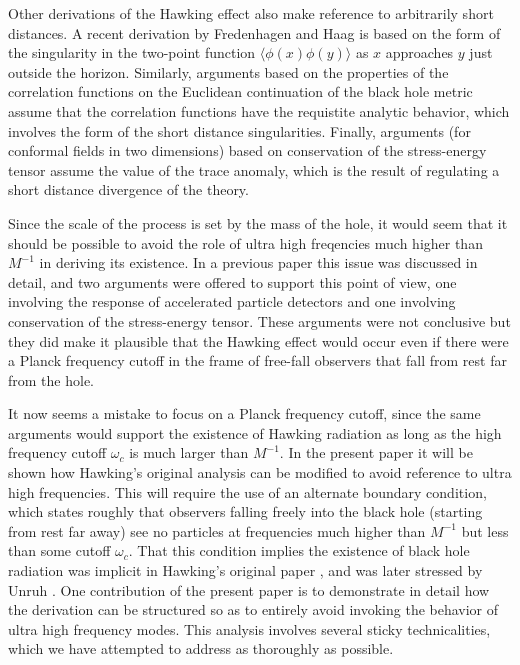 Other derivations of the Hawking effect also make reference
to arbitrarily short distances. A recent derivation by
Fredenhagen and Haag \cite{FredHaag} is based on the form of the
singularity in the two-point function
$\langle\phi(x)\phi(y)\rangle$ as $x$ approaches $y$
just outside the horizon.
Similarly, arguments based on the properties of the
correlation functions on the Euclidean continuation of the
black hole metric \cite{GibbPerry} assume that the correlation
functions have the requistite analytic behavior, which
involves the form of the short distance singularities.
Finally, arguments (for conformal fields  in two dimensions)
based on conservation of the stress-energy tensor
\cite{DavFullUn,ChristFull} assume the value of the trace
anomaly, which is the result of regulating a short distance
divergence of the theory.

Since the scale of the process is set by the mass of the
hole, it would seem that it should be possible to avoid the
role of ultra high freqencies much higher than $M^{-1}$
in deriving its existence. In a previous paper \cite{Jac} this
issue was discussed in detail, and two arguments were
offered to support this point of view, one involving the
response of accelerated particle detectors and one involving
conservation of the stress-energy tensor. These arguments
were not conclusive but they did make it plausible that the
Hawking effect would occur even if there were a Planck
frequency cutoff in the frame of free-fall observers that
fall from rest far from the hole.

It now seems a mistake to focus on a Planck frequency
cutoff, since the same arguments would support the existence
of Hawking radiation as long as the high frequency  cutoff
$\omega_c$ is much larger than $M^{-1}$.
In the present paper it will be shown how Hawking's original
analysis can be modified to avoid reference to ultra high
frequencies. This will require the use of an alternate
boundary condition, which states roughly that observers
falling freely into the black hole (starting from rest
far away) see no particles at frequencies much higher than
$M^{-1}$ but less than some cutoff $\omega_c$.
That this condition implies the existence of
black hole radiation was implicit in Hawking's original
paper \cite{Hawk75}, and was later stressed by Unruh \cite{Origin}.
One contribution of the present paper is to demonstrate
in detail how the derivation can be structured so as to
entirely avoid invoking the behavior of ultra high
frequency modes. This analysis involves several sticky technicalities,
which we have attempted to address as thoroughly as possible.

